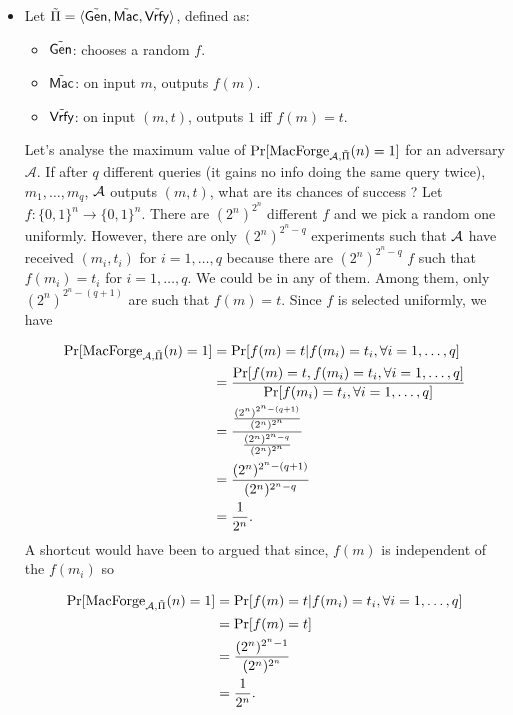 \begin{solution}
  \begin{itemize}
    \item
      Let $\tilde{\Pi} = \langle \tilde{\operatorname{\mathsf{Gen}}}, \tilde{\operatorname{\mathsf{Mac}}}, \tilde{\operatorname{\mathsf{Vrfy}}} \rangle$, defined as:
      \begin{itemize}
        \item $\tilde{\operatorname{\mathsf{Gen}}}$: chooses a random $f$.
        \item $\tilde{\operatorname{\mathsf{Mac}}}$: on input $m$, outputs $f(m)$.
        \item $\tilde{\operatorname{\mathsf{Vrfy}}}$: on input $(m,t)$, outputs $1$ iff $f(m) = t$.
      \end{itemize}

      Let's analyse the maximum value of $\Pr[\operatorname{MacForge}_{\mathcal{A}, \tilde{\Pi}}(n) = 1]$ for an adversary $\mathcal{A}$.
      If after $q$ different queries (it gains no info doing the same query twice),
      $m_1, \ldots, m_q$, $\mathcal{A}$ outputs $(m, t)$, what are its chances of success ?
      Let $f:\{0,1\}^n \to \{0,1\}^n$.
      There are $(2^n)^{2^n}$ different $f$ and we pick a random one uniformly.
      However, there are only $(2^n)^{2^n-q}$ experiments such that $\mathcal{A}$ have received $(m_i,t_i)$ for $i = 1, \ldots, q$ because
      there are $(2^n)^{2^n-q}$ $f$ such that $f(m_i) = t_i$ for $i = 1, \ldots, q$.
      We could be in any of them.
      Among them, only $(2^n)^{2^n-(q+1)}$ are such that $f(m) = t$.
      Since $f$ is selected uniformly, we have

      \begin{align*}
        \Pr[\operatorname{MacForge}_{\mathcal{A}, \tilde{\Pi}}(n) = 1]
        & = \Pr[f(m) = t | f(m_i) = t_i, \forall i = 1, \ldots, q]\\
        & = \frac{\Pr[f(m) = t, f(m_i) = t_i, \forall i = 1, \ldots, q]}{\Pr[f(m_i) = t_i, \forall i = 1, \ldots, q]}\\
        & = \frac{\frac{(2^n)^{2^n-(q+1)}}{(2^n)^{2^n}}}{\frac{(2^n)^{2^n-q}}{(2^n)^{2^n}}}\\
        & = \frac{(2^n)^{2^n-(q+1)}}{(2^n)^{2^n-q}}\\
        & = \frac{1}{2^n}.
      \end{align*}
      A shortcut would have been to argued that since, $f(m)$ is independent of the $f(m_i)$ so

      \begin{align*}
        \Pr[\operatorname{MacForge}_{\mathcal{A}, \tilde{\Pi}}(n) = 1]
        & = \Pr[f(m) = t | f(m_i) = t_i, \forall i = 1, \ldots, q]\\
        & = \Pr[f(m) = t]\\
        & = \frac{(2^n)^{2^n-1}}{(2^n)^{2^n}}\\
        & = \frac{1}{2^n}.
      \end{align*}


\end{itemize}
\end{solution}
